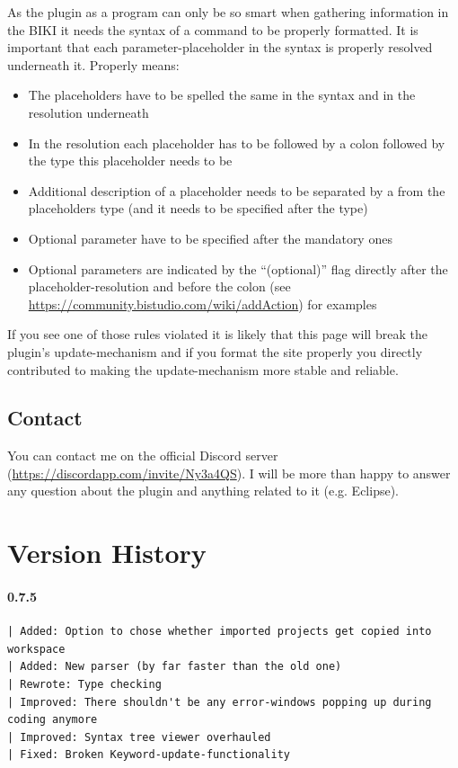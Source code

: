 \documentclass[twoside=false]{scrbook}
\newcommand{\eclipse}{Eclipse\xspace}
\begin{document}
	As the plugin as a program can only be so smart when gathering information in the BIKI it needs the syntax of a command to be properly formatted. It is important that each parameter-placeholder in the syntax is properly resolved underneath it. Properly means:
	\begin{itemize}
		\item The placeholders have to be spelled the same in the syntax and in the resolution underneath
		\item In the resolution each placeholder has to be followed by a colon followed by the type this placeholder needs to be
		\item Additional description of a placeholder needs to be separated by a \keys{-} from the placeholders type (and it needs to be specified after the type)
		\item Optional parameter have to be specified after the mandatory ones
		\item Optional parameters are indicated by the “(optional)” flag directly after the placeholder-resolution and before the colon (see \url{https://community.bistudio.com/wiki/addAction}) for examples
	\end{itemize}
	
	If you see one of those rules violated it is likely that this page will break the plugin's update-mechanism and if you format the site properly you directly contributed to making the update-mechanism more stable and reliable.

	
	\section{Contact}
	\label{sec:Contact}
	You can contact me on the official Discord server (\url{https://discordapp.com/invite/Ny3a4QS}). I will be more than happy to answer any question about the plugin and anything related to it (e.g. \eclipse).
	
	
	
	\chapter{Version History}
	\label{ch:VersionHistory}
	
	\subsubsection*{0.7.5}
	\begin{lstlisting}[breaklines=true]
| Added: Option to chose whether imported projects get copied into workspace
| Added: New parser (by far faster than the old one)
| Rewrote: Type checking
| Improved: There shouldn't be any error-windows popping up during coding anymore
| Improved: Syntax tree viewer overhauled
| Fixed: Broken Keyword-update-functionality
	\end{lstlisting}
	
\end{document}
